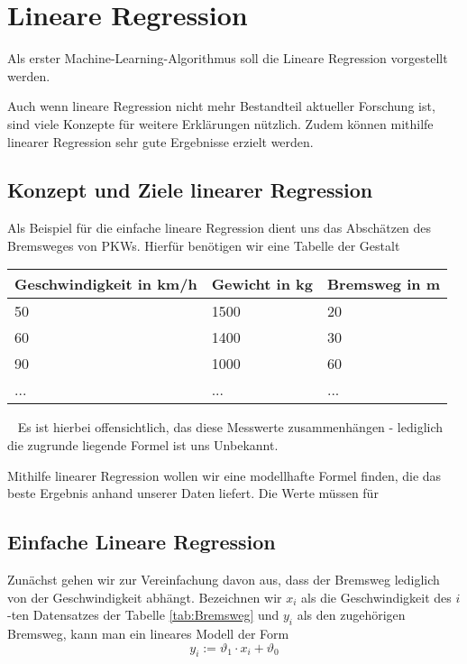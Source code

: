 \section{Lineare Regression}
\label{sec:LineareRegression}
Als erster Machine-Learning-Algorithmus soll die Lineare Regression vorgestellt werden. 

Auch wenn lineare Regression nicht mehr Bestandteil aktueller Forschung ist, sind viele Konzepte für weitere Erklärungen nützlich. Zudem können mithilfe linearer Regression sehr gute Ergebnisse erzielt werden.
\subsection{Konzept und Ziele linearer Regression}
Als Beispiel für die einfache lineare Regression dient uns das Abschätzen des Bremsweges von PKWs. Hierfür benötigen wir eine Tabelle der Gestalt

\begin{center}
	\label{tab:Bremsweg}
	\begin{tabular}{|p{}|p{}|p{}|}
		\hline
		Geschwindigkeit in km/h & Gewicht in kg & Bremsweg in m  \\ \hline
		50& 1500 & 20 \\ \hline
		60& 1400 & 30 \\ \hline
		90& 1000 & 60 \\ \hline
		...& ... & ... \\ \hline
	\end{tabular}
\end{center}
~\newline
Es ist hierbei offensichtlich, das diese Messwerte zusammenhängen - lediglich die zugrunde liegende Formel ist uns Unbekannt. 

Mithilfe linearer Regression wollen wir eine modellhafte Formel finden, die das beste Ergebnis anhand unserer Daten liefert. Die Werte müssen für 
\subsection{Einfache Lineare Regression}
Zunächst gehen wir zur Vereinfachung davon aus, dass der Bremsweg lediglich von der Geschwindigkeit abhängt. Bezeichnen wir $x_i$ als die Geschwindigkeit des $i$-ten Datensatzes der Tabelle \ref{tab:Bremsweg} und $y_i$ als den zugehörigen Bremsweg, kann man ein lineares Modell der Form 
\begin{equation}
	y_i := \vartheta_1 \cdot x_i + \vartheta_0 
\end{equation}

